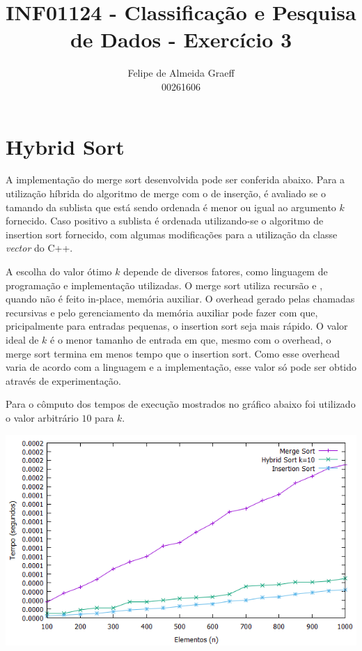 \documentclass[10pt,a4paper]{article}
\begin{document}
	\title{INF01124 - Classificação e Pesquisa de Dados - Exercício 3}
	\date{}
	\author{Felipe de Almeida Graeff\\00261606}
	\maketitle

	\section{Hybrid Sort}

		A implementação do merge sort desenvolvida pode ser conferida abaixo.
		Para a utilização híbrida do algoritmo de merge com o de inserção, é avaliado 
		se o tamando da sublista que está sendo ordenada é menor ou igual ao argumento 
		$k$ fornecido. Caso positivo a sublista é ordenada utilizando-se o algoritmo 
		de insertion sort fornecido, com algumas modificações para a utilização da classe 
		\emph{vector} do C++.
		
		A escolha do valor ótimo $k$ depende de diversos fatores, como linguagem de programação 
		e implementação utilizadas. O merge sort utiliza recursão e , quando não é feito in-place, 
		memória auxiliar. O overhead gerado pelas chamadas recursivas e pelo gerenciamento da 
		memória auxiliar pode fazer com que, pricipalmente para entradas pequenas, o insertion 
		sort seja mais rápido. O valor ideal de $k$ é o menor tamanho de entrada em que, mesmo 
		com o overhead, o merge sort termina em menos tempo que o insertion sort. Como esse 
		overhead varia de acordo com a linguagem e a implementação, esse valor só pode ser obtido 
		através de experimentação.
		
		Para o cômputo dos tempos de execução mostrados no gráfico abaixo foi utilizado o valor 
		arbitrário $10$ para $k$.
		
		
		
		

		\includegraphics[width=\textwidth]{plot.png}
	
\end{document}
